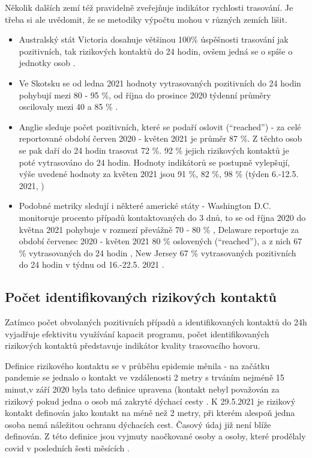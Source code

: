 Několik dalších zemí též pravidelně zveřejňuje indikátor rychlosti trasování. Je třeba si ale uvědomit, že se metodiky výpočtu mohou v různých zemích lišit.

\begin{itemize}
\item Australský stát Victoria dosahuje většinou 100\% úspěšnosti trasování jak pozitivních, tak rizikových kontaktů do 24 hodin, ovšem jedná se o spíše o jednotky osob \cite{tr_victoria}.
\item Ve Skotsku se od ledna 2021 hodnoty vytrasovaných pozitivních do 24 hodin pohybují mezi 80 - 95 \%, od října do prosince 2020 týdenní průměry oscilovaly mezi 40 a 85 \% \cite{tr_scotland}.
\item Anglie sleduje počet pozitivních, které se podaří oslovit (“reached”) - za celé reportované období červen 2020 - květen 2021 je průměr 87 \%. Z těchto osob se pak daří do 24 hodin trasovat 72 \%. 92 \% jejich rizikových kontaktů je poté vytrasováno do 24 hodin. Hodnoty indikátorů se postupně vylepšují, výše uvedené hodnoty za květen 2021 jsou 91 \%, 82 \%, 98 \% (týden 6.-12.5. 2021, \cite{tr_gov_uk03})
\item Podobné metriky sledují i některé americké státy - Washington D.C. monitoruje procento případů kontaktovaných do 3 dnů, to se od října 2020 do května 2021 pohybuje v rozmezí převážně 70 - 80 \% \cite{tr_DC}, Delaware reportuje za období červenec 2020 - květen 2021 80 \% oslovených (“reached”), a z nich 67 \% vytrasovaných do 24 hodin \cite{tr_Delaware}, New Jersey 67 \% vytrasovaných pozitivních do 24 hodin v týdnu od 16.-22.5. 2021 \cite{tr_NewJersey}.
\end{itemize}

\subsection*{Počet identifikovaných rizikových kontaktů}

Zatímco počet obvolaných pozitivních případů a identifikovaných kontaktů do 24h vyjadřuje efektivitu využívání kapacit programu, počet identifikovaných rizikových kontaktů představuje indikátor kvality trasovacího hovoru.

Definice rizikového kontaktu se v průběhu epidemie měnila - na začátku pandemie se jednalo o kontakt ve vzdálenosti 2 metry s trváním nejméně 15 minut,v září 2020 byla tato definice upravena (kontakt nebyl považován za rizikový pokud jedna o osob má zakryté dýchací cesty \cite{tr_MZCR}. K 29.5.2021 je rizikový kontakt definován jako kontakt na méně než 2 metry, při kterém alespoň jedna osoba nemá náležitou ochranu dýchacích cest. Časový údaj již není blíže definován. Z této definice jsou vyjmuty naočkované osoby a osoby, které prodělaly covid v posledních šesti měsících \cite{tr_covidgov}.

